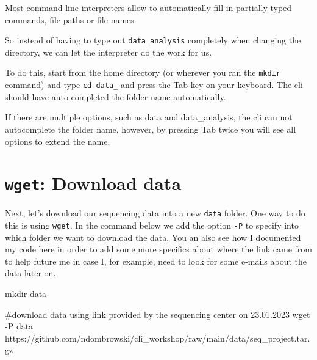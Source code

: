 \documentclass[
  letterpaper,
  DIV=11,
  numbers=noendperiod]{scrreprt}
\newenvironment{Shaded}{}{}
\newcommand{\AttributeTok}[1]{\textcolor[rgb]{0.84,0.23,0.29}{#1}}
\newcommand{\CommentTok}[1]{\textcolor[rgb]{0.42,0.45,0.49}{#1}}
\newcommand{\FunctionTok}[1]{\textcolor[rgb]{0.44,0.26,0.76}{#1}}
\newcommand{\NormalTok}[1]{\textcolor[rgb]{0.14,0.16,0.18}{#1}}
\begin{document}
\begin{tcolorbox}[enhanced jigsaw, rightrule=.15mm, colbacktitle=quarto-callout-tip-color!10!white, colframe=quarto-callout-tip-color-frame, colback=white, arc=.35mm, opacitybacktitle=0.6, coltitle=black, bottomtitle=1mm, breakable, bottomrule=.15mm, leftrule=.75mm, titlerule=0mm, title=\textcolor{quarto-callout-tip-color}{\faLightbulb}\hspace{0.5em}{Tip: Command-line completion}, toprule=.15mm, toptitle=1mm, opacityback=0, left=2mm]

Most command-line interpreters allow to automatically fill in partially
typed commands, file paths or file names.

So instead of having to type out \texttt{data\_analysis} completely when
changing the directory, we can let the interpreter do the work for us.

To do this, start from the home directory (or wherever you ran the
\texttt{mkdir} command) and type \texttt{cd\ data\_} and press the
Tab-key on your keyboard. The cli should have auto-completed the folder
name automatically.

If there are multiple options, such as data and data\_analysis, the cli
can not autocomplete the folder name, however, by pressing Tab twice you
will see all options to extend the name.

\end{tcolorbox}

\section{\texorpdfstring{\texttt{wget}: Download
data}{wget: Download data}}\label{wget-download-data}

Next, let's download our sequencing data into a new \texttt{data}
folder. One way to do this is using \texttt{wget}. In the command below
we add the option \texttt{-P} to specify into which folder we want to
download the data. You an also see how I documented my code here in
order to add some more specifics about where the link came from to help
future me in case I, for example, need to look for some e-mails about
the data later on.

\begin{Shaded}
\begin{Highlighting}[]
\FunctionTok{mkdir}\NormalTok{ data}

\CommentTok{\#download data using link provided by the sequencing center on 23.01.2023}
\FunctionTok{wget} \AttributeTok{{-}P}\NormalTok{ data https://github.com/ndombrowski/cli\_workshop/raw/main/data/seq\_project.tar.gz}
\end{Highlighting}
\end{Shaded}
\end{document}
